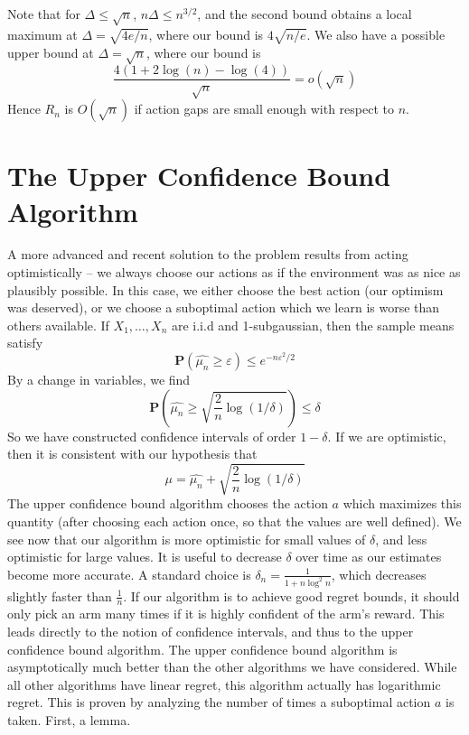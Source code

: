 Note that for $\Delta \leq \sqrt{n}$, $n \Delta \leq n^{3/2}$, and the second bound obtains a local maximum at $\Delta = \sqrt{4e/n}$, where our bound is $4 \sqrt{n/e}$. We also have a possible upper bound at $\Delta = \sqrt{n}$, where our bound is
%
\[ \frac{4(1 + 2 \log(n) - \log(4))}{\sqrt{n}} = o(\sqrt{n}) \]
%
Hence $R_n$ is $O(\sqrt{n})$ if action gaps are small enough with respect to $n$.

\section{The Upper Confidence Bound Algorithm}

A more advanced and recent solution to the problem results from acting optimistically -- we always choose our actions as if the environment was as nice as plausibly possible. In this case, we either choose the best action (our optimism was deserved), or we choose a suboptimal action which we learn is worse than others available. If $X_1, \dots, X_n$ are i.i.d and 1-subgaussian, then the sample means satisfy
%
\[ \mathbf{P}(\widehat{\mu_n} \geq \varepsilon) \leq e^{-n\varepsilon^2/2} \]
%
By a change in variables, we find
%
\[ \mathbf{P}\left(\widehat{\mu_n} \geq \sqrt{\frac{2}{n} \log(1/\delta)} \right) \leq \delta \]
%
So we have constructed confidence intervals of order $1-\delta$. If we are optimistic, then it is consistent with our hypothesis that
%
\[ \mu = \widehat{\mu_n} + \sqrt{\frac{2}{n} \log(1/\delta)} \]
%
The upper confidence bound algorithm chooses the action $a$ which maximizes this quantity (after choosing each action once, so that the values are well defined). We see now that our algorithm is more optimistic for small values of $\delta$, and less optimistic for large values. It is useful to decrease $\delta$ over time as our estimates become more accurate. A standard choice is $\delta_n = \frac{1}{1 + n \log^2 n}$, which decreases slightly faster than $\frac{1}{n}$. If our algorithm is to achieve good regret bounds, it should only pick an arm many times if it is highly confident of the arm's reward. This leads directly to the notion of confidence intervals, and thus to the upper confidence bound algorithm. The upper confidence bound algorithm is asymptotically much better than the other algorithms we have considered. While all other algorithms have linear regret, this algorithm actually has logarithmic regret. This is proven by analyzing the number of times a suboptimal action $a$ is taken. First, a lemma.


